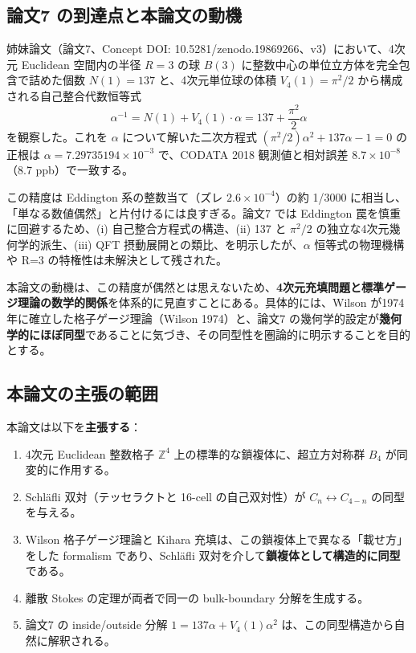 \documentclass[a4paper,11pt]{ltjsarticle}
\begin{document}
\subsection{論文7 の到達点と本論文の動機}

姉妹論文（論文7、Concept DOI: 10.5281/zenodo.19869266、v3）において、4次元 Euclidean 空間内の半径 $R = 3$ の球 $B(3)$ に整数中心の単位立方体を完全包含で詰めた個数 $N(1) = 137$ と、4次元単位球の体積 $V_4(1) = \pi^2/2$ から構成される自己整合代数恒等式
\begin{equation}
\alpha^{-1} = N(1) + V_4(1) \cdot \alpha = 137 + \frac{\pi^2}{2}\alpha \tag{1.1}
\end{equation}
を観察した。これを $\alpha$ について解いた二次方程式 $(\pi^2/2)\alpha^2 + 137\alpha - 1 = 0$ の正根は $\alpha = 7.29735194\times 10^{-3}$ で、CODATA 2018 観測値と相対誤差 $8.7 \times 10^{-8}$（8.7 ppb）で一致する。

この精度は Eddington 系の整数当て（ズレ $2.6 \times 10^{-4}$）の約 1/3000 に相当し、「単なる数値偶然」と片付けるには良すぎる。論文7 では Eddington 罠を慎重に回避するため、(i) 自己整合方程式の構造、(ii) 137 と $\pi^2/2$ の独立な4次元幾何学的派生、(iii) QFT 摂動展開との類比、を明示したが、$\alpha$ 恒等式の物理機構や R=3 の特権性は未解決として残された。

本論文の動機は、この精度が偶然とは思えないため、\textbf{4次元充填問題と標準ゲージ理論の数学的関係}を体系的に見直すことにある。具体的には、Wilson が1974年に確立した格子ゲージ理論（Wilson 1974）と、論文7 の幾何学的設定が\textbf{幾何学的にほぼ同型}であることに気づき、その同型性を圏論的に明示することを目的とする。

\subsection{本論文の主張の範囲}

本論文は以下を\textbf{主張する}：

\begin{enumerate}
\item 4次元 Euclidean 整数格子 $\mathbb{Z}^4$ 上の標準的な鎖複体に、超立方対称群 $B_4$ が同変的に作用する。
\item Schläfli 双対（テッセラクトと 16-cell の自己双対性）が $C_n \leftrightarrow C_{4-n}$ の同型を与える。
\item Wilson 格子ゲージ理論と Kihara 充填は、この鎖複体上で異なる「載せ方」をした formalism であり、Schläfli 双対を介して\textbf{鎖複体として構造的に同型}である。
\item 離散 Stokes の定理が両者で同一の bulk-boundary 分解を生成する。
\item 論文7 の inside/outside 分解 $1 = 137\alpha + V_4(1)\alpha^2$ は、この同型構造から自然に解釈される。
\end{enumerate}
\end{document}
